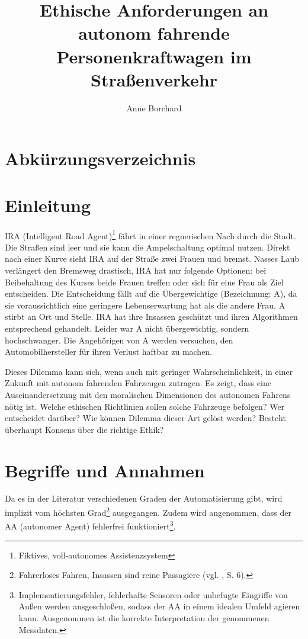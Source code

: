 \documentclass[a4paper, 12pt, titlepage]{scrartcl}
\begin{document}
\author{Anne Borchard}
\title{Ethische Anforderungen an autonom fahrende Personenkraftwagen im Stra\ss enverkehr}
\publishers{Humboldt-Universit\"at zu Berlin}
\maketitle
\tableofcontents
\newpage

\section*{Abk\"urzungsverzeichnis}
\begin{acronym}
\end{acronym}
\newpage

\section{Einleitung}
	IRA (Intelligent Road Agent)\footnote{Fiktives, voll-autonomes Assistenzsystem} fährt in einer regnerischen Nach durch die Stadt. Die Straßen sind leer und sie kann die Ampelschaltung optimal nutzen. Direkt nach einer Kurve sieht IRA auf der Straße zwei Frauen und bremst. Nasses Laub verl\"angert den Bremsweg drastisch, IRA hat nur folgende Optionen: bei Beibehaltung des Kurses beide Frauen treffen oder sich f\"ur eine Frau als Ziel entscheiden. Die Entscheidung fällt auf die \"Ubergewichtige (Bezeichnung: A), da sie voraussichtlich eine geringere Lebenserwartung hat als die andere Frau. A stirbt an Ort und Stelle. IRA hat ihre Insassen geschützt und ihren Algorithmen entsprechend gehandelt. Leider war A nicht übergewichtig, sondern hochschwanger. Die Angehörigen von A werden versuchen, den Automobilhersteller für ihren Verlust haftbar zu machen.
	
	Dieses Dilemma kann sich, wenn auch mit geringer Wahrscheinlichkeit, in einer Zukunft mit autonom fahrenden Fahrzeugen zutragen. Es zeigt, dass eine Auseinandersetzung mit den moralischen Dimensionen des autonomen Fahrens n\"otig ist. Welche ethischen Richtlinien sollen solche Fahrzeuge befolgen? Wer entscheidet dar\"uber? Wie k\"onnen Dilemma dieser Art gel\"ost werden? Besteht \"uberhaupt Konsens \"uber die \glqq richtige\grqq{} Ethik?
\section{Begriffe und Annahmen}
	Da es in der Literatur verschiedenen Graden der Automatisierung gibt, wird implizit vom h\"ochsten Grad\footnote{Fahrerloses Fahren, Insassen sind reine Passagiere (vgl. \autocite{bmvi2015}, S. 6).} ausgegangen. Zudem wird angenommen, dass der AA (autonomer Agent) fehlerfrei funktioniert\footnote{Implementierungsfehler, fehlerhafte Sensoren oder unbefugte Eingriffe von Au\ss en werden ausgeschlo\ss en, sodass der AA in einem idealen Umfeld agieren kann. Ausgenommen ist die korrekte Interpretation der genommenen Messdaten.}.
	
\end{document}
